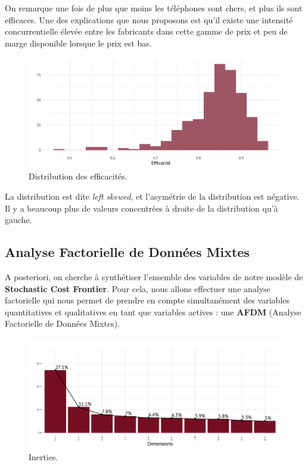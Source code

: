 \documentclass[
  12pt,
]{report}
\begin{document}
On remarque une fois de plus que moins les téléphones sont chers, et
plus ils sont efficaces. Une des explications que nous proposons est
qu'il existe une intensité concurrentielle élevée entre les fabricants
dans cette gamme de prix et peu de marge disponible lorsque le prix est
bas.

\begin{figure}[H]

{\centering \includegraphics{report_files/figure-pdf/unnamed-chunk-11-1.pdf}

}

\caption{Distribution des efficacités.}

\end{figure}%

La distribution est dite \emph{left skewed}, et l'asymétrie de la
distribution est négative. Il y a beaucoup plus de valeurs concentrées à
droite de la distribution qu'à gauche.

\newpage

\subsection{Analyse Factorielle de Données
Mixtes}\label{analyse-factorielle-de-donnuxe9es-mixtes}

A posteriori, on cherche à synthétiser l'ensemble des variables de notre
modèle de \textbf{Stochastic Cost Frontier}. Pour cela, nous allons
effectuer une analyse factorielle qui nous permet de prendre en compte
simultanément des variables quantitatives et qualitatives en tant que
variables actives : une \textbf{AFDM} (Analyse Factorielle de Données
Mixtes).

\begin{figure}[H]

{\centering \includegraphics{report_files/figure-pdf/unnamed-chunk-13-1.pdf}

}

\caption{Inerties.}

\end{figure}%
\end{document}

